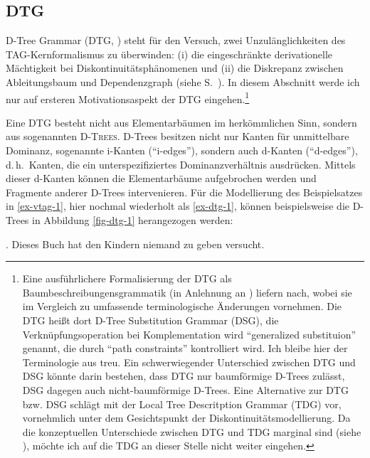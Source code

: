 \subsection{DTG} \label{sec-dtg}

D-Tree Grammar (DTG, \citealt{Rambow:etal:95}) steht für den Versuch, zwei Unzulänglichkeiten des TAG-Kernformalismus zu überwinden: (i) die eingeschränkte derivationelle Mächtigkeit bei Diskontinuitätsphänomenen und (ii) die Diskrepanz zwischen Ableitungsbaum und Dependenzgraph (siehe S.~\pageref{sec-ableitungsbaum}). In diesem Abschnitt werde ich nur auf ersteren Motivationsaspekt der DTG eingehen.\footnote{Eine ausführlichere Formalisierung der DTG als Baumbeschreibungensgrammatik (in Anlehnung an \citealt{Vijay-Shanker:92}) liefern \cite{Rambow:etal:01} nach, wobei sie im Vergleich zu \cite{Rambow:etal:95} umfassende terminologische Änderungen vornehmen. Die DTG hei\ss t dort D-Tree Substitution Grammar (DSG), die Verknüpfungsoperation bei Komplementation wird "`generalized substituion"' genannt, die durch "`path constraints"' kontrolliert wird. Ich bleibe hier der Terminologie aus \cite{Rambow:etal:95} treu. Ein schwerwiegender Unterschied zwischen DTG und DSG könnte darin bestehen, dass DTG nur baumförmige D-Trees zulässt, DSG dagegen auch nicht-baumförmige D-Trees. Eine Alternative zur DTG bzw. DSG schlägt \cite{Kallmeyer:01} mit der Local Tree Descritption Grammar (TDG) vor, vornehmlich unter dem Gesichtspunkt der Diskontinuitätsmodellierung. Da die konzeptuellen Unterschiede zwischen DTG und TDG marginal sind (siehe \citealt[118]{Rambow:etal:01}), möchte ich auf die TDG an dieser Stelle nicht weiter eingehen.}

Eine DTG besteht nicht aus Elementarbäumen im herkömmlichen Sinn, sondern aus sogenannten \textsc{D-Trees}. D-Trees besitzen nicht nur Kanten für unmittelbare Dominanz, sogenannte i-Kanten ("`i-edges"'), sondern auch d-Kanten ("`d-edges"'), d.\,h.\ Kanten, die ein unterspezifiziertes Dominanzverhältnis ausdrücken. Mittels dieser d-Kanten können die Elementarbäume aufgebrochen werden und Fragmente anderer D-Trees intervenieren. Für die Modellierung des Beispielsatzes in \ref{ex-vtag-1}, hier nochmal wiederholt als \ref{ex-dtg-1}, können beispielsweise die D-Trees in Abbildung \ref{fig-dtg-1} herangezogen werden: 

\ex. {Dieses Buch} hat {den Kindern} niemand {zu geben} versucht. \label{ex-dtg-1}

